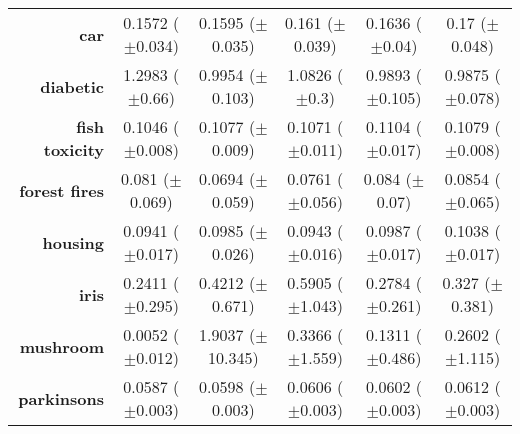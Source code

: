\begin{table}[htbp]
{\begin{tabular}{r|ccccc}
			\textbf{car}                 & \cellcolor[rgb]{ .388,  .745,  .482}0.1572 ($\pm$0.034) & \cellcolor[rgb]{ .757,  .851,  .502}0.1595 ($\pm$0.035) & \cellcolor[rgb]{ 1,  .922,  .518}0.161 ($\pm$0.039)     & \cellcolor[rgb]{ .992,  .773,  .49}0.1636 ($\pm$0.04)  & \cellcolor[rgb]{ .973,  .412,  .42}0.17 ($\pm$0.048)    \\
			\textbf{diabetic}            & \cellcolor[rgb]{ .973,  .412,  .42}1.2983 ($\pm$0.66)   & \cellcolor[rgb]{ 1,  .922,  .518}0.9954 ($\pm$0.103)    & \cellcolor[rgb]{ .992,  .776,  .49}1.0826 ($\pm$0.3)    & \cellcolor[rgb]{ .525,  .784,  .49}0.9893 ($\pm$0.105) & \cellcolor[rgb]{ .388,  .745,  .482}0.9875 ($\pm$0.078) \\
			\textbf{fish toxicity}       & \cellcolor[rgb]{ .388,  .745,  .482}0.1046 ($\pm$0.008) & \cellcolor[rgb]{ 1,  .922,  .518}0.1077 ($\pm$0.009)    & \cellcolor[rgb]{ .882,  .886,  .51}0.1071 ($\pm$0.011)  & \cellcolor[rgb]{ .973,  .412,  .42}0.1104 ($\pm$0.017) & \cellcolor[rgb]{ 1,  .886,  .514}0.1079 ($\pm$0.008)    \\
			\textbf{forest fires}        & \cellcolor[rgb]{ 1,  .922,  .518}0.081 ($\pm$0.069)     & \cellcolor[rgb]{ .388,  .745,  .482}0.0694 ($\pm$0.059) & \cellcolor[rgb]{ .737,  .843,  .502}0.0761 ($\pm$0.056) & \cellcolor[rgb]{ .984,  .569,  .451}0.084 ($\pm$0.07)  & \cellcolor[rgb]{ .973,  .412,  .42}0.0854 ($\pm$0.065)  \\
			\textbf{housing}             & \cellcolor[rgb]{ .388,  .745,  .482}0.0941 ($\pm$0.017) & \cellcolor[rgb]{ 1,  .922,  .518}0.0985 ($\pm$0.026)    & \cellcolor[rgb]{ .412,  .749,  .482}0.0943 ($\pm$0.016) & \cellcolor[rgb]{ 1,  .906,  .518}0.0987 ($\pm$0.017)   & \cellcolor[rgb]{ .973,  .412,  .42}0.1038 ($\pm$0.017)  \\
			\textbf{iris}                & \cellcolor[rgb]{ .388,  .745,  .482}0.2411 ($\pm$0.295) & \cellcolor[rgb]{ .992,  .741,  .486}0.4212 ($\pm$0.671) & \cellcolor[rgb]{ .973,  .412,  .42}0.5905 ($\pm$1.043)  & \cellcolor[rgb]{ .651,  .82,  .494}0.2784 ($\pm$0.261) & \cellcolor[rgb]{ 1,  .922,  .518}0.327 ($\pm$0.381)     \\
			\textbf{mushroom}            & \cellcolor[rgb]{ .388,  .745,  .482}0.0052 ($\pm$0.012) & \cellcolor[rgb]{ .973,  .412,  .42}1.9037 ($\pm$10.345) & \cellcolor[rgb]{ 1,  .898,  .514}0.3366 ($\pm$1.559)    & \cellcolor[rgb]{ .69,  .831,  .498}0.1311 ($\pm$0.486) & \cellcolor[rgb]{ 1,  .922,  .518}0.2602 ($\pm$1.115)    \\
			\textbf{parkinsons}          & \cellcolor[rgb]{ .388,  .745,  .482}0.0587 ($\pm$0.003) & \cellcolor[rgb]{ .82,  .867,  .506}0.0598 ($\pm$0.003)  & \cellcolor[rgb]{ .988,  .694,  .475}0.0606 ($\pm$0.003) & \cellcolor[rgb]{ 1,  .922,  .518}0.0602 ($\pm$0.003)   & \cellcolor[rgb]{ .973,  .412,  .42}0.0612 ($\pm$0.003)  \\

\end{tabular}}
\end{table}
